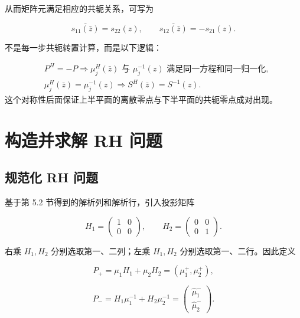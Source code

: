 \documentclass[
    lang=cn,
    scheme=chinese,
    mode=simple,
    device=normal,
    color=blue,
    math=cm,
    thmcnt=section,
    12pt
]{elegantbook}
\begin{document}
从而矩阵元满足相应的共轭关系，可写为

\begin{equation}
    \overline{s_{11}(\bar z)}=s_{22}(z),
    \qquad
    \overline{s_{12}(\bar z)}=-s_{21}(z).
    \tag{5.2.30}
    \label{eq:5.2.30}
\end{equation}

\begin{callout}[2.2 节真正要记住什么？]
    不是每一步共轭转置计算，而是以下逻辑：

    \[
        \begin{aligned}
             & P^H=-P
            \Longrightarrow
            \mu_j^H(\bar z)\text{ 与 }\mu_j^{-1}(z)
            \text{ 满足同一方程和同一归一化},
            \\
             & \mu_j^H(\bar z)=\mu_j^{-1}(z)
            \Longrightarrow
            S^H(\bar z)=S^{-1}(z).
        \end{aligned}
    \]
    这个对称性后面保证上半平面的离散零点与下半平面的共轭零点成对出现。
\end{callout}

\section{构造并求解 RH 问题}

\subsection{规范化 RH 问题}

基于第 5.2 节得到的解析列和解析行，引入投影矩阵

\begin{equation}
    H_1=
    \begin{pmatrix}
        1 & 0 \\
        0 & 0
    \end{pmatrix},
    \qquad
    H_2=
    \begin{pmatrix}
        0 & 0 \\
        0 & 1
    \end{pmatrix}.
    \tag{5.3.1}
    \label{eq:5.3.1}
\end{equation}

右乘 $H_1,H_2$ 分别选取第一、二列；左乘 $H_1,H_2$ 分别选取第一、二行。因此定义

\[
    P_+
    =
    \mu_1H_1+\mu_2H_2
    =
    (\mu_1^+,\mu_2^+),
\]

\[
    P_-
    =
    H_1\mu_1^{-1}+H_2\mu_2^{-1}
    =
    \begin{pmatrix}
        \widehat\mu_1^- \\
        \widehat\mu_2^-
    \end{pmatrix}.
\]
\end{document}
